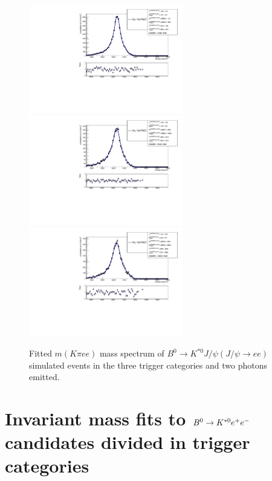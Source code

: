 \begin{figure}[h!]
\centering
\includegraphics[width=0.6\textwidth]{RKst/figs/fit_EEs_0_EE-q2central-gmc/KstJPsEE_2g_L0E_fitAndRes.pdf}
\includegraphics[width=0.6\textwidth]{RKst/figs/fit_EEs_0_EE-q2central-gmc/KstJPsEE_2g_L0H_fitAndRes.pdf}
\includegraphics[width=0.6\textwidth]{RKst/figs/fit_EEs_0_EE-q2central-gmc/KstJPsEE_2g_L0I_fitAndRes.pdf}
\caption{Fitted $m(K\pi ee)$ mass spectrum of $B^0 \rightarrow K^{*0} J/\psi(J/\psi\rightarrow ee)$ simulated
events in the three trigger categories and two photons emitted. }
\label{fig:FitEE_MC_inTrigCat_Brem2}
\end{figure}

\chapter{Invariant mass fits to $B^0\rightarrow K^{*0}e^+ e^-$ candidates divided in trigger categories}
\label{app:RKDatafits}

